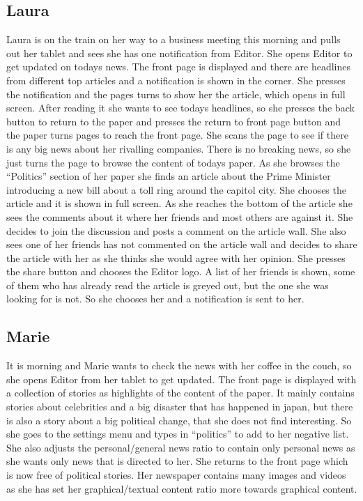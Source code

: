 \subsection{Laura}
Laura is on the train on her way to a business meeting this morning and pulls out her tablet and sees she has one notification from Editor. She opens Editor to get updated on todays news. The front page is displayed and there are headlines from different top articles and a notification is shown in the corner. She presses the notification and the pages turns to show her the article, which opens in full screen. After reading it she wants to see todays headlines, so she presses the back button to return to the paper and presses the return to front page button and the paper turns pages to reach the front page. She scans the page to see if there is any big news about her rivalling companies. There is no breaking news, so she just turns the page to browse the content of todays paper. As she browses the ``Politics'' section of her paper she finds an article about the Prime Minister introducing a new bill about a toll ring around the capitol city. She chooses the article and it is shown in full screen. As she reaches the bottom of the article she sees the comments about it where her friends and most others are against it. She decides to join the discussion and posts a comment on the article wall. She also sees one of her friends has not commented on the article wall and decides to share the article with her as she thinks she would agree with her opinion. She presses the share button and chooses the Editor logo. A list of her friends is shown, some of them who has already read the article is greyed out, but the one she was looking for is not. So she chooses her and a notification is sent to her.

\subsection{Marie}
It is morning and Marie wants to check the news with her coffee in the couch, so she opens Editor from her tablet to get updated. The front page is displayed with a collection of stories as highlights of the content of the paper. It mainly contains stories about celebrities and a big disaster that has happened in japan, but there is also a story about a big political change, that she does not find interesting. So she goes to the settings menu and types in ``politics'' to add to her negative list. She also adjusts the personal/general news ratio to contain only personal news as she wants only news that is directed to her. She returns to the front page which is now free of political stories. Her newspaper contains many images and videos as she has set her graphical/textual content ratio more towards graphical content.

